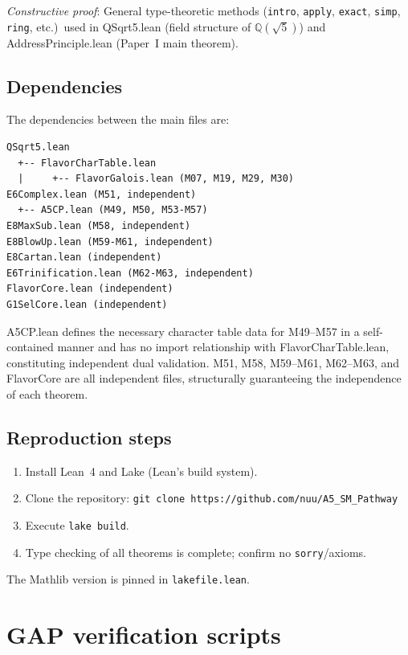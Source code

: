 \documentclass[sn-mathphys-num,Numbered]{sn-jnl}
\theoremstyle{thmstyleone}
\theoremstyle{thmstylethree}
\begin{document}
\begin{appendices}
\emph{Constructive proof}: General type-theoretic methods (\texttt{intro},
\texttt{apply}, \texttt{exact}, \texttt{simp}, \texttt{ring}, etc.)\ used in
QSqrt5.lean (field structure of $\mathbb{Q}(\sqrt{5})$) and
AddressPrinciple.lean (Paper~I main theorem).


\subsection{Dependencies}

The dependencies between the main files are:
\begin{verbatim}
QSqrt5.lean
  +-- FlavorCharTable.lean
  |     +-- FlavorGalois.lean (M07, M19, M29, M30)
E6Complex.lean (M51, independent)
  +-- A5CP.lean (M49, M50, M53-M57)
E8MaxSub.lean (M58, independent)
E8BlowUp.lean (M59-M61, independent)
E8Cartan.lean (independent)
E6Trinification.lean (M62-M63, independent)
FlavorCore.lean (independent)
G1SelCore.lean (independent)
\end{verbatim}

A5CP.lean defines the necessary character table data for M49--M57 in a
self-contained manner and has no import relationship with
FlavorCharTable.lean, constituting independent dual validation.
M51, M58, M59--M61, M62--M63, and FlavorCore are all independent files,
structurally guaranteeing the independence of each theorem.


\subsection{Reproduction steps}

\begin{enumerate}
  \item Install Lean~4 and Lake (Lean's build system).
  \item Clone the repository:
    \texttt{git clone https://github.com/nuu/A5\_SM\_Pathway}
  \item Execute \texttt{lake build}.
  \item Type checking of all theorems is complete; confirm no
    \texttt{sorry}/axioms.
\end{enumerate}

The Mathlib version is pinned in \texttt{lakefile.lean}.


\section{GAP verification scripts}\label{app:gap}


\end{appendices}
\end{document}
